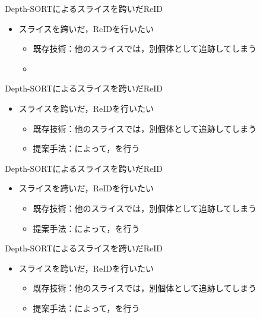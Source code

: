 \begin{frame}{Depth-SORTによるスライスを跨いだReID}
    \begin{itemize}
        \item スライスを跨いだ，ReIDを行いたい
        \begin{itemize}
            \item 既存技術：他のスライスでは，別個体として追跡してしまう
            \item[\phantom{}] 
        \end{itemize}
    \end{itemize}
\end{frame}
\begin{frame}[noframenumbering]{Depth-SORTによるスライスを跨いだReID}
    \begin{itemize}
        \item スライスを跨いだ，ReIDを行いたい
        \begin{itemize}
            \item 既存技術：他のスライスでは，別個体として追跡してしまう
            \item[\red{$\blacktriangleright$}] 提案手法：によって，を行う
        \end{itemize}
    \end{itemize}
\end{frame}
\begin{frame}[noframenumbering]{Depth-SORTによるスライスを跨いだReID}
    \begin{itemize}
        \item スライスを跨いだ，ReIDを行いたい
        \begin{itemize}
            \item 既存技術：他のスライスでは，別個体として追跡してしまう
            \item[\red{$\blacktriangleright$}] 提案手法：によって，を行う
        \end{itemize}
    \end{itemize}
\end{frame}
\begin{frame}[noframenumbering]{Depth-SORTによるスライスを跨いだReID}
    \begin{itemize}
        \item スライスを跨いだ，ReIDを行いたい
        \begin{itemize}
            \item 既存技術：他のスライスでは，別個体として追跡してしまう
            \item[\red{$\blacktriangleright$}] 提案手法：によって，を行う
        \end{itemize}
    \end{itemize}
\end{frame}
